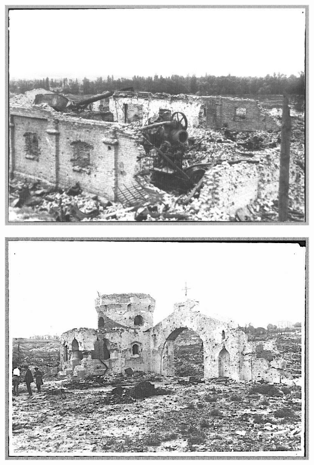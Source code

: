 \begin{center}
\includegraphics[width=\textwidth]{chast-vosp/zver/vz008.jpg}
\end{center}
\vspace*{\fill}

\newpage
\vspace*{\fill}

\begin{center}
\includegraphics[width=\textwidth]{chast-vosp/zver/vz009.jpg}
\end{center}


